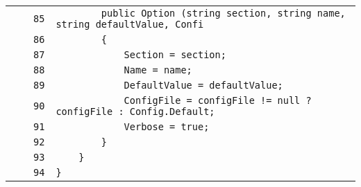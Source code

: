 \documentclass[a4paper,10pt]{article}
\begin{document}
\begin{longtable}[l]{lrrl}
\cellcolor{gray} &  & \verb~85~ & \verb~        public Option (string section, string name, string defaultValue, Confi~\\
\cellcolor{gray} &  & \verb~86~ & \verb~        {~\\
\cellcolor{gray} &  & \verb~87~ & \verb~            Section = section;~\\
\cellcolor{gray} &  & \verb~88~ & \verb~            Name = name;~\\
\cellcolor{gray} &  & \verb~89~ & \verb~            DefaultValue = defaultValue;~\\
\cellcolor{gray} &  & \verb~90~ & \verb~            ConfigFile = configFile != null ? configFile : Config.Default;~\\
\cellcolor{gray} &  & \verb~91~ & \verb~            Verbose = true;~\\
\cellcolor{gray} &  & \verb~92~ & \verb~        }~\\
\cellcolor{gray} &  & \verb~93~ & \verb~    }~\\
\cellcolor{gray} &  & \verb~94~ & \verb~}~\\
\end{longtable}
\end{document}
